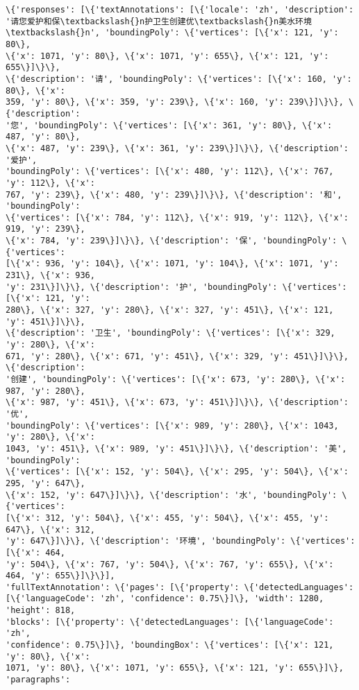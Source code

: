 \documentclass[11pt]{article}
\begin{document}
    \begin{Verbatim}[commandchars=\\\{\}]
\{'responses': [\{'textAnnotations': [\{'locale': 'zh', 'description':
'请您爱护和保\textbackslash{}n护卫生创建优\textbackslash{}n美水环境\textbackslash{}n', 'boundingPoly': \{'vertices': [\{'x': 121, 'y': 80\},
\{'x': 1071, 'y': 80\}, \{'x': 1071, 'y': 655\}, \{'x': 121, 'y': 655\}]\}\},
\{'description': '请', 'boundingPoly': \{'vertices': [\{'x': 160, 'y': 80\}, \{'x':
359, 'y': 80\}, \{'x': 359, 'y': 239\}, \{'x': 160, 'y': 239\}]\}\}, \{'description':
'您', 'boundingPoly': \{'vertices': [\{'x': 361, 'y': 80\}, \{'x': 487, 'y': 80\},
\{'x': 487, 'y': 239\}, \{'x': 361, 'y': 239\}]\}\}, \{'description': '爱护',
'boundingPoly': \{'vertices': [\{'x': 480, 'y': 112\}, \{'x': 767, 'y': 112\}, \{'x':
767, 'y': 239\}, \{'x': 480, 'y': 239\}]\}\}, \{'description': '和', 'boundingPoly':
\{'vertices': [\{'x': 784, 'y': 112\}, \{'x': 919, 'y': 112\}, \{'x': 919, 'y': 239\},
\{'x': 784, 'y': 239\}]\}\}, \{'description': '保', 'boundingPoly': \{'vertices':
[\{'x': 936, 'y': 104\}, \{'x': 1071, 'y': 104\}, \{'x': 1071, 'y': 231\}, \{'x': 936,
'y': 231\}]\}\}, \{'description': '护', 'boundingPoly': \{'vertices': [\{'x': 121, 'y':
280\}, \{'x': 327, 'y': 280\}, \{'x': 327, 'y': 451\}, \{'x': 121, 'y': 451\}]\}\},
\{'description': '卫生', 'boundingPoly': \{'vertices': [\{'x': 329, 'y': 280\}, \{'x':
671, 'y': 280\}, \{'x': 671, 'y': 451\}, \{'x': 329, 'y': 451\}]\}\}, \{'description':
'创建', 'boundingPoly': \{'vertices': [\{'x': 673, 'y': 280\}, \{'x': 987, 'y': 280\},
\{'x': 987, 'y': 451\}, \{'x': 673, 'y': 451\}]\}\}, \{'description': '优',
'boundingPoly': \{'vertices': [\{'x': 989, 'y': 280\}, \{'x': 1043, 'y': 280\}, \{'x':
1043, 'y': 451\}, \{'x': 989, 'y': 451\}]\}\}, \{'description': '美', 'boundingPoly':
\{'vertices': [\{'x': 152, 'y': 504\}, \{'x': 295, 'y': 504\}, \{'x': 295, 'y': 647\},
\{'x': 152, 'y': 647\}]\}\}, \{'description': '水', 'boundingPoly': \{'vertices':
[\{'x': 312, 'y': 504\}, \{'x': 455, 'y': 504\}, \{'x': 455, 'y': 647\}, \{'x': 312,
'y': 647\}]\}\}, \{'description': '环境', 'boundingPoly': \{'vertices': [\{'x': 464,
'y': 504\}, \{'x': 767, 'y': 504\}, \{'x': 767, 'y': 655\}, \{'x': 464, 'y': 655\}]\}\}],
'fullTextAnnotation': \{'pages': [\{'property': \{'detectedLanguages':
[\{'languageCode': 'zh', 'confidence': 0.75\}]\}, 'width': 1280, 'height': 818,
'blocks': [\{'property': \{'detectedLanguages': [\{'languageCode': 'zh',
'confidence': 0.75\}]\}, 'boundingBox': \{'vertices': [\{'x': 121, 'y': 80\}, \{'x':
1071, 'y': 80\}, \{'x': 1071, 'y': 655\}, \{'x': 121, 'y': 655\}]\}, 'paragraphs':

\end{Verbatim}
\end{document}
